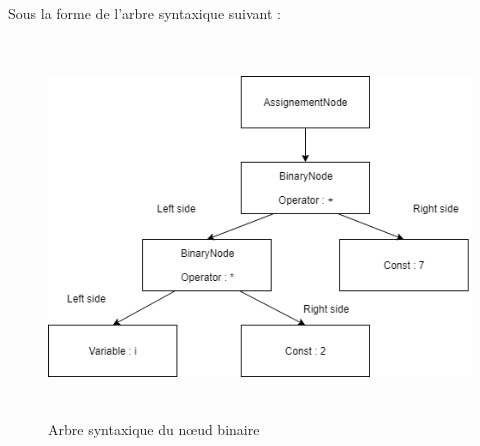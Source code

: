 \documentclass[12pt, twoside, openright]{report}
\begin{document}

Sous la forme de l'arbre syntaxique suivant : 
\begin{center}
    \begin{figure}[H]
        \includegraphics[height=10cm,width=14cm]{Ast/ASTBinaryNode.png}
        \caption{Arbre syntaxique du n\oe{}ud binaire}
    \end{figure}
\end{center}
\end{document}
